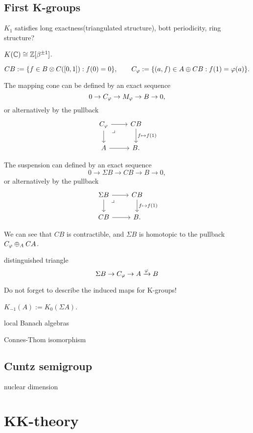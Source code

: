 \documentclass{../../large}
\begin{document}
\section{First K-groups}


$K_1$ satisfies
long exactness(triangulated structure), bott periodicity, ring structure?

$K(\mathbb{C})\cong\mathbb{Z}[\beta^{\pm1}]$.

\[CB:=\{f\in B\otimes C([0,1]):f(0)=0\},\qquad C_\varphi:=\{(a,f)\in A\oplus CB:f(1)=\varphi(a)\}.\]

The mapping cone can be defined by an exact sequence
\[0\to C_\varphi\to M_\varphi\to B\to0,\]
or alternatively by the pullback
\[\begin{tikzcd}
C_\f\rar\dar\ar[dr, phantom, "\lrcorner", very near start] & CB\dar{f\mapsto f(1)} \\
A \rar & B.
\end{tikzcd}\]

The suspension can defined by an exact sequence
\[0\to\Sigma B\to CB\to B\to0,\]
or alternatively by the pullback
\[\begin{tikzcd}
\Sigma B\rar\dar\ar[dr, phantom, "\lrcorner", very near start] & CB\dar{f\mapsto f(1)} \\
CB \rar & B.
\end{tikzcd}\]

We can see that $CB$ is contractible, and $\Sigma B$ is homotopic to the pullback $C_\varphi\oplus_ACA$.

distinguished triangle
\[\Sigma B\to C_\varphi\to A\xrightarrow{\varphi}B\]

Do not forget to describe the induced maps for K-groups!



$K_{-1}(A):=K_0(\Sigma A)$.





local Banach algebras



\begin{prb}
\end{prb}
Connes-Thom isomorphism


\section{Cuntz semigroup}

nuclear dimension




\chapter{KK-theory}
\end{document}

